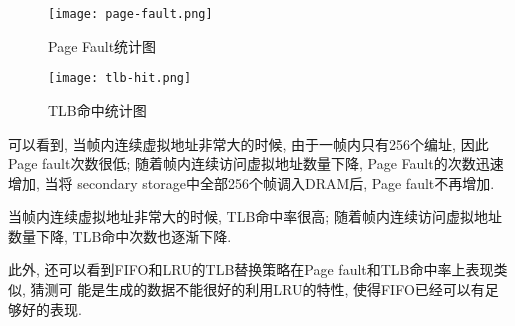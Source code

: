 \begin{figure}[ht!]
    \centering
    \texttt{[image: page-fault.png]}
    \caption{Page Fault统计图}
    \label{fig:page-fault统计图}
\end{figure}

\begin{figure}[ht!]
    \centering
    \texttt{[image: tlb-hit.png]}
    \caption{TLB命中统计图}
    \label{fig:tlb统计图}
\end{figure}

可以看到, 当帧内连续虚拟地址非常大的时候, 由于一帧内只有256个编址, 因此Page
fault次数很低; 随着帧内连续访问虚拟地址数量下降, Page Fault的次数迅速增加, 当将
secondary storage中全部256个帧调入DRAM后, Page fault不再增加.\par

当帧内连续虚拟地址非常大的时候, TLB命中率很高; 随着帧内连续访问虚拟地址数量下降,
TLB命中次数也逐渐下降.\par

此外, 还可以看到FIFO和LRU的TLB替换策略在Page fault和TLB命中率上表现类似, 猜测可
能是生成的数据不能很好的利用LRU的特性, 使得FIFO已经可以有足够好的表现.